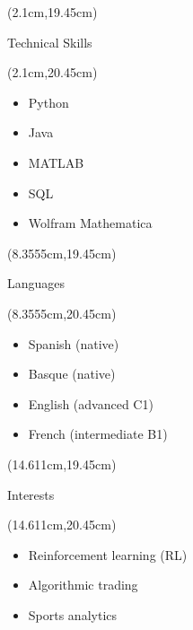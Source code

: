 \documentclass{resume}
\begin{document}
\begin{multicols}{3}
\begin{textblock*}{5.8cm}(2.1cm,19.45cm)
\begin{rSection}{\large{Technical Skills}}
\end{rSection}
\end{textblock*}
\begin{textblock*}{10cm}(2.1cm,20.45cm)
\begin{itemize}\setlength\itemsep{-4.5pt}
    \item Python
    \item Java
    \item MATLAB
    \item SQL
    \item Wolfram Mathematica
\end{itemize}
\end{textblock*}

\begin{textblock*}{5.8cm}(8.3555cm,19.45cm)
\begin{rSection}{\large{Languages}}
\end{rSection}
\end{textblock*}
\begin{textblock*}{10cm}(8.3555cm,20.45cm)
\begin{itemize}\setlength\itemsep{-0.5pt}
    \item Spanish (native)
    \item Basque (native)
    \item English (advanced C1)
    \item French (intermediate B1)
\end{itemize}
\end{textblock*}

\begin{textblock*}{5.8cm}(14.611cm,19.45cm)
\begin{rSection}{\large{Interests}}
\end{rSection}
\end{textblock*}
\begin{textblock*}{10cm}(14.611cm,20.45cm)
\begin{itemize}\setlength\itemsep{-0.5pt}
    \item Reinforcement learning (RL)
    \item Algorithmic trading
    \item Sports analytics
\end{itemize}
\end{textblock*}
\end{multicols}
\end{document}

